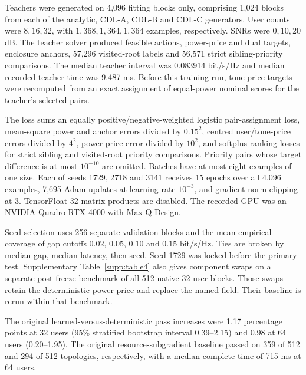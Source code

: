 \documentclass[10pt,letterpaper]{article}
\begin{document}
Teachers were generated on 4,096 fitting blocks only, comprising 1,024
blocks from each of the analytic, CDL-A, CDL-B and CDL-C generators.
User counts were \(8,16,32\), with \(1,368,1,364,1,364\) examples,
respectively. SNRs were \(0,10,20\) dB. The teacher solver produced
feasible actions, power-price and dual targets, enclosure anchors, 57,296
visited-root labels and 56,571 strict sibling-priority comparisons.
The median teacher interval was 0.083914 bit/s/Hz and median recorded
teacher time was 9.487 ms. Before this training run, tone-price targets
were recomputed from an exact assignment of equal-power nominal scores
for the teacher's selected pairs.

The loss sums an equally positive/negative-weighted logistic pair-assignment
loss, mean-square power and anchor errors divided by \(0.15^2\), centred
user/tone-price errors divided by \(4^2\), power-price error divided by
\(10^2\), and softplus ranking losses for strict sibling and visited-root
priority comparisons. Priority pairs whose target difference is at most
\(10^{-10}\) are omitted. Batches have at most eight examples of one size.
Each of seeds 1729, 2718 and 3141 receives 15 epochs over all 4,096 examples,
7,695 Adam updates at learning rate \(10^{-3}\), and gradient-norm clipping
at 3. TensorFloat-32 matrix products are disabled.
The recorded GPU was an NVIDIA Quadro RTX 4000 with Max-Q Design.

Seed selection uses 256 separate validation blocks and the mean empirical
coverage of gap cutoffs \(0.02\), \(0.05\), \(0.10\) and \(0.15\) bit/s/Hz. Ties are broken
by median gap, median latency, then seed. Seed 1729 was locked before
the primary test. Supplementary Table~\ref{supp:table4} also gives component swaps on a
separate post-freeze benchmark of all 512 native 32-user blocks.
Those swaps retain the deterministic power price and replace the named
field. Their baseline is rerun within that benchmark.

The original learned-versus-deterministic pass increases were 1.17 percentage points at 32 users (95\% stratified bootstrap interval 0.39--2.15) and 0.98 at 64 users (0.20--1.95). The original resource-subgradient baseline passed on 359 of 512 and 294 of 512 topologies, respectively, with a median complete time of 715 ms at 64 users.
\end{document}
